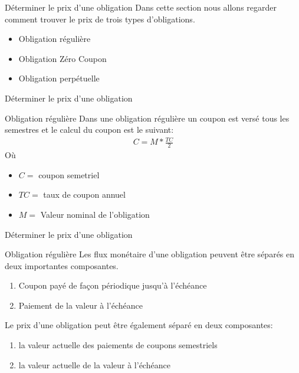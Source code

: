 \documentclass[11pt]{beamer}
\begin{document}
\begin{frame}{Déterminer le prix d'une obligation}
Dans cette section nous allons regarder comment trouver le prix de trois types d'obligations.
\begin{itemize}
\item Obligation régulière 
\item Obligation Zéro Coupon
\item Obligation perpétuelle
\end{itemize}
\end{frame}


\begin{frame}{Déterminer le prix d'une obligation}
\begin{block}{Obligation régulière}
Dans une obligation régulière un coupon est versé tous les semestres et le calcul du coupon est le suivant:
\begin{align*}
C= M * \frac{TC}{2}
\end{align*}
Où 
\begin{itemize}
\item $C=$ coupon semetriel 
\item $TC=$ taux de coupon annuel 
\item $M=$ Valeur nominal de l'obligation 
\end{itemize}

\end{block}
\end{frame}

\begin{frame}{Déterminer le prix d'une obligation}
\begin{block}{Obligation régulière}
Les flux monétaire d'une obligation peuvent être séparés en deux importantes composantes. 

\begin{enumerate}
\item Coupon payé de façon périodique jusqu'à l'échéance
\item Paiement de la valeur à l'échéance
\end{enumerate}
\vspace{1cm}
Le prix d'une obligation peut être également séparé en deux composantes:

\begin{enumerate}
\item la valeur actuelle des paiements de coupons semestriels
\item la valeur actuelle de la valeur à l'échéance 
\end{enumerate}
\end{block}
\end{frame}
\end{document}
